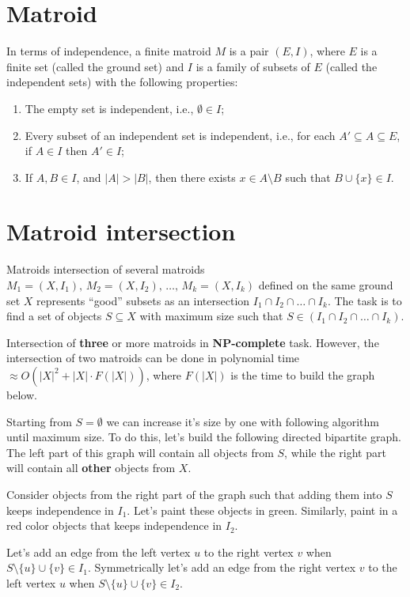 \section*{Matroid}

In terms of independence, a finite matroid $M$ is a pair $(E, I)$, where 
$E$ is a finite set (called the ground set) and 
$I$ is a family of subsets of $E$ (called the independent sets) 
with the following properties:

\begin{enumerate}
\item The empty set is independent, i.e., $\emptyset \in I$;
\item Every subset of an independent set is independent, i.e., for each $A' \subseteq A \subseteq E$, if $A \in I$ then $A' \in I$;
\item If $A, B \in I$, and $|A| > |B|$, then there exists $x \in A \setminus B$ such that $B \cup \{ x \} \in I$.
\end{enumerate}

\section*{Matroid intersection}
Matroids intersection of several matroids $M_1 = (X, I_1), \, M_2 = (X, I_2), \, \dots , \, M_k = (X, I_k)$ defined on the same ground set $X$ represents “good” subsets as an intersection
$I_1 \cap I_2 \cap \dots \cap I_k$. 
The task is to find a set of objects $S \subseteq X$ with maximum size such that $S \in (I_1 \cap I_2 \cap \dots \cap I_k)$. 

Intersection of \textbf{three} or more matroids in \textbf{NP-complete} task.
However, the intersection of two matroids can be done in polynomial time $\approx O(|X|^2 + |X| \cdot F(|X|))$, where $F(|X|)$ is the time to build the graph below.

Starting from $S = \emptyset$ we can increase it's size by one with following algorithm until maximum size. To do this, let’s build the following directed bipartite graph. 
The left part of this graph will contain all objects from $S$, while the right part will contain all \textbf{other} objects from $X$.

Consider objects from the right part of the graph such that adding them into $S$ keeps independence in $I_1$. 
Let’s paint these objects in green. Similarly, paint in a red color objects that keeps independence in $I_2$. 

Let’s add an edge from the left vertex $u$ to the right vertex $v$ when $S \setminus \{ u \} \cup \{ v \} \in I_1$.
Symmetrically let’s add an edge from the right vertex $v$ to the left vertex $u$ when $S \setminus \{ u \} \cup \{ v \} \in I_2$.

